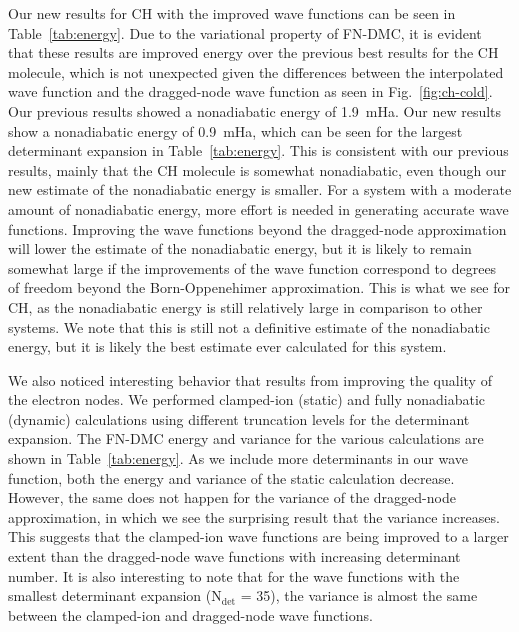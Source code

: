 \documentclass[aip,jcp,numerical,reprint]{revtex4-1}
\begin{document}
Our new results for CH with the improved wave functions can be seen in Table~\ref{tab:energy}.  Due to the variational property of FN-DMC, it is evident that these results are improved energy over the previous best results for the CH molecule, which is not unexpected given the differences between the interpolated wave function and the dragged-node wave function as seen in Fig.~\ref{fig:ch-cold}. Our previous results showed a nonadiabatic energy of 1.9~mHa. Our new results show a nonadiabatic energy of 0.9~mHa, which can be seen for the largest determinant expansion in Table~\ref{tab:energy}.  This is consistent with our previous results, mainly that the CH molecule is somewhat nonadiabatic, even though our new estimate of the nonadiabatic energy is smaller.  For a system with a moderate amount of nonadiabatic energy, more effort is needed in generating accurate wave functions.  Improving the wave functions beyond the dragged-node approximation will lower the estimate of the nonadiabatic energy, but it is likely to remain somewhat large if the improvements of the wave function correspond to degrees of freedom beyond the Born-Oppenehimer approximation. This is what we see for CH, as the nonadiabatic energy is still  relatively large in comparison to other systems.  We note that this is still not a definitive estimate of the nonadiabatic energy, but it is likely the best estimate ever calculated for this system.   


We also noticed interesting behavior that results from improving the quality of the electron nodes.  We performed clamped-ion (static) and fully nonadiabatic (dynamic) calculations using different truncation levels for the determinant expansion. The FN-DMC energy and variance for the various calculations are shown in Table~\ref{tab:energy}. As we include more determinants in our wave function, both the energy and variance of the static calculation decrease. %
However, the same does not happen for the variance of the dragged-node approximation, in which we see the surprising result that the variance increases.  This suggests that the clamped-ion wave functions are being improved to a larger extent than the dragged-node wave functions with increasing determinant number.  It is also interesting to note that for the wave functions with the smallest determinant expansion (N$_{\text{det}}$ = 35),  the variance is almost the same between the clamped-ion and dragged-node wave functions. 
\end{document}
